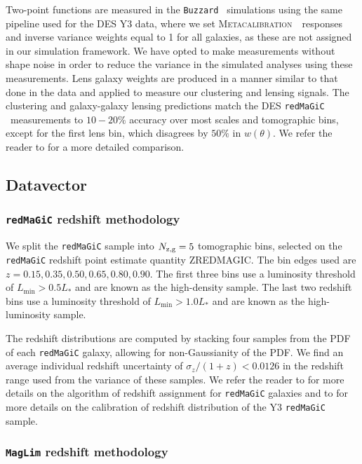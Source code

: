 \documentclass[aps, prd,twocolumn,superscriptaddress,nofootinbib,preprintnumbers]{revtex4-1}
\newcommand{\wtheta}{\ensuremath{w(\theta)}}
\newcommand{\redmagic}{\texttt{redMaGiC} }
\newcommand{\maglim}{\texttt{MagLim} }
\newcommand{\buzzard}{\texttt{Buzzard} }
\newcommand{\metacal}{{\textsc{Metacalibration}~}}
\begin{document}
Two-point functions are measured in the \buzzard\ simulations using the same pipeline used for the DES Y3 data, where we set \metacal\ responses and inverse variance weights equal to 1 for all galaxies, as these are not assigned in our simulation framework. We have opted to make measurements without shape noise in order to reduce the variance in the simulated analyses using these measurements. Lens galaxy weights are produced in a manner similar to that done in the data and applied to measure our clustering and lensing signals. The clustering and galaxy-galaxy lensing predictions match the DES \redmagic\ measurements to $10-20\%$ accuracy over most scales and tomographic bins, except for the first lens bin, which disagrees by $50\%$ in \wtheta. We refer the reader to \citet*{y3-simvalidation} for a more detailed comparison.

\subsection{Datavector}

\subsubsection{\redmagic redshift methodology}
\label{sec:lensz}
We split the \redmagic sample into $N_{\rm z,g} = 5$ tomographic bins, selected on the \redmagic redshift point estimate quantity ZREDMAGIC. The bin edges used are $z=0.15, 0.35, 0.50, 0.65, 0.80, 0.90$. The first three bins use a luminosity threshold of $L_{\min} > 0.5 L_{*}$ and are known as the high-density sample. The last two redshift bins use a luminosity threshold of $L_{\min} > 1.0 L_{*}$ and are known as the high-luminosity sample.

The redshift distributions are computed by stacking four samples from the PDF of each \redmagic galaxy, allowing for non-Gaussianity of the PDF. We find an average individual redshift uncertainty of $\sigma_z/(1+z) < 0.0126$ in the redshift range used from the variance of these samples. We refer the reader to \citet{Rozo_2016} for more details on the algorithm of redshift assignment for \redmagic galaxies and to \citet{y3-lenswz} for more details on the calibration of redshift distribution of the Y3 \redmagic sample.  

\subsubsection{\maglim redshift methodology}
\end{document}
